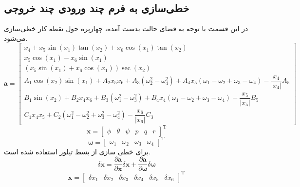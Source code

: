 \subsection{خطی‌سازی به فرم چند ورودی چند خروجی}\label{lin_MIMO}
در این قسمت با توجه به فضای حالت بدست آمده، چهارپره حول نقطه کار خطی‌سازی می‌شود.
\begin{equation*}
	\boldsymbol a = \begin{bmatrix}
		x_4 + x_5\sin(x_1)\tan(x_2) + x_6\cos(x_1)\tan(x_2)\\
		x_5\cos(x_1)- x_6\sin(x_1)\\
		(x_5\sin(x_1) + x_6\cos(x_1))\sec(x_2)\\
		A_1\cos(x_2)\sin(x_1) + 
		A_2x_5x_6 + A_3\left(\omega_2^2-\omega_4^2\right)+
		A_4x_5\left(\omega_1-\omega_2+\omega_3-\omega_4\right)- \dfrac{x_4}{\lvert x_4\rvert}A_5\\
		B_1\sin(x_2) + 
		B_2x_4x_6 + B_3\left(\omega_1^2-\omega_3^2\right)+
		B_4x_4\left(\omega_1-\omega_2+\omega_3-\omega_4\right)- \dfrac{x_5}{\lvert x_5\rvert}B_5\\
		C_1x_4x_5 + 
		C_2\left(\omega_1^2-\omega_2^2+\omega_3^2-\omega_4^2\right)- \dfrac{x_6}{\lvert x_6\rvert}C_3
	\end{bmatrix}
\end{equation*} 
\begin{equation}
	\boldsymbol{x} = \begin{bmatrix} %
		\phi& \theta & \psi & p& q& r
	\end{bmatrix}^\mathrm{T}
\end{equation}
\begin{equation}
	\boldsymbol{\omega} = \begin{bmatrix}
		\omega_1&\omega_2&\omega_3&\omega_4
	\end{bmatrix}^\mathrm{T}
\end{equation}
برای خطی سازی از بسط تیلور استفاده شده ‌است.
\begin{equation}
	\delta \dot{\boldsymbol{x}} = \dfrac{\partial  \boldsymbol a}{\partial  \boldsymbol x}\delta \boldsymbol x + \dfrac{\partial \boldsymbol a}{\partial \boldsymbol \omega}\delta \boldsymbol \omega 
\end{equation}
\begin{equation}
	\dot{\boldsymbol{x}} =
	\begin{bmatrix}
		\delta \dot x_1&
		\delta \dot x_2&
		\delta \dot x_3&
		\delta \dot x_4&
		\delta \dot x_5&
		\delta \dot x_6
	\end{bmatrix}^\mathrm{T}
\end{equation}

